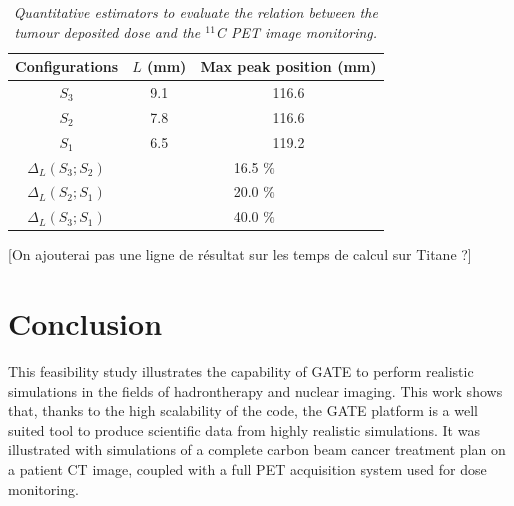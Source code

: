 \documentclass[11pt]{iopart}
\newcommand{\dsnote}[1]{{\color{green}[#1]}}
\begin{document}
\begin{table}[htbp]
\begin{center}
\begin{tabular}{|c|c|c|} \hline
 Configurations                & $L$ (mm)            & Max peak position (mm)      \\\hline
$S_{3}$                       & 9.1                  &  116.6                       \\ \hline
$S_{2}$                       & 7.8                  &  116.6                 \\ \hline
$S_{1}$                       & 6.5                  &  119.2            \\ \hline 
$\Delta_{L}(S_{3};S_{2})$         &       \multicolumn{2}{c|}{16.5 $\%$}  \\ \hline
$\Delta_{L}(S_{2};S_{1})$         &        \multicolumn{2}{c|}{20.0 $\%$} \\ \hline
$\Delta_{L}(S_{3};S_{1})$         &        \multicolumn{2}{c|}{40.0 $\%$}  \\ \hline \hline
\end{tabular}
\end{center} 
\caption{\it Quantitative estimators to evaluate the relation between the tumour deposited dose and the $^{11}$C PET image monitoring.}
\label{tab:dose}
\end{table}


\dsnote{On ajouterai pas une ligne de résultat sur les temps de calcul
  sur Titane ?}

\clearpage
\section{Conclusion}

This feasibility study illustrates the capability of GATE to perform
realistic simulations in the fields of hadrontherapy and nuclear
imaging. This work shows that, thanks to the high scalability of the
code, the GATE platform is a well suited tool to produce scientific
data from highly realistic simulations. It was illustrated with
simulations of a complete carbon beam cancer treatment plan on a
patient CT image, coupled with a full PET acquisition system used for
dose monitoring.

\end{document}
